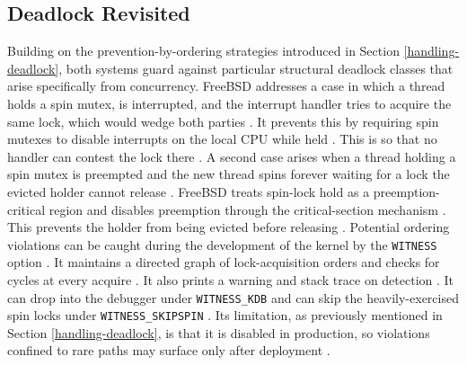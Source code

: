 \subsection{Deadlock Revisited} \label{deadlock-revisited} %

Building on the prevention-by-ordering strategies introduced in Section \ref{handling-deadlock}, both systems guard against
particular structural deadlock classes that arise specifically from concurrency. FreeBSD addresses a case in which a thread holds a
spin mutex, is interrupted, and the interrupt handler tries to acquire the same lock, which would wedge both parties
\parencite{freebsd_mutex}. It prevents this by requiring spin mutexes to disable interrupts on the local CPU while held
\parencite{freebsd_mutex}. This is so that no handler can contest the lock there \parencite{freebsd_mutex}.
A second case arises when a thread holding a spin mutex is preempted and the new thread spins forever waiting for a lock the
evicted holder cannot release \parencite{freebsd_smp_handbook}. FreeBSD treats spin-lock hold as a preemption-critical region
and disables preemption through the critical-section mechanism \parencite{freebsd_smp_handbook}. This prevents the holder from
being evicted before releasing \parencite{freebsd_smp_handbook}. Potential ordering violations can be caught during the development
of the kernel by the \texttt{WITNESS} option \parencite{freebsd_kerneldebug}. It maintains a directed graph of lock-acquisition
orders and checks for cycles at every acquire \parencite{freebsd_kerneldebug}. It also prints a warning and stack trace on detection
\parencite{freebsd_kerneldebug}. It can drop into the debugger under \texttt{WITNESS\_KDB} and can skip the heavily-exercised spin
locks under \texttt{WITNESS\_SKIPSPIN} \parencite{freebsd_kerneldebug}. Its limitation, as previously mentioned in Section
\ref{handling-deadlock}, is that it is disabled in production, so violations confined to rare paths may surface only after
deployment \parencite{freebsd_kerneldebug}.

